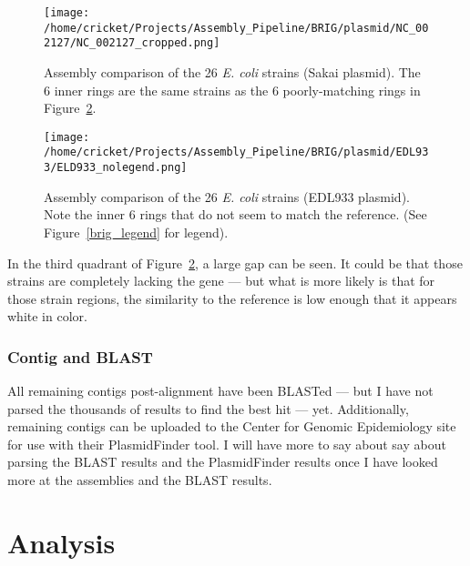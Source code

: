 \documentclass[11pt]{article}
\begin{document}
\begin{figure}[h!]\normalsize %
\centering
\texttt{[image: /home/cricket/Projects/Assembly\_Pipeline/BRIG/plasmid/NC\_002127/NC\_002127\_cropped.png]}
\caption{Assembly comparison of the 26 \textit{E. coli} strains (Sakai plasmid). The 6 inner rings are the same strains as the 6 poorly-matching rings in Figure~\ref{plasmid_alignment_1}.}
\label{plasmid_alignment_2}
\end{figure}

\begin{figure}[h!]\normalsize %
\centering
\texttt{[image: /home/cricket/Projects/Assembly\_Pipeline/BRIG/plasmid/EDL933/ELD933\_nolegend.png]}
\caption{Assembly comparison of the 26 \textit{E. coli} strains (EDL933 plasmid). Note the inner 6 rings that do not seem to match the reference. (See Figure~\ref{brig_legend} for legend).}
\label{plasmid_alignment_1}
\end{figure}
\clearpage


In the third quadrant of Figure~\ref{plasmid_alignment_1}, a large gap can be seen. It could be that those strains are completely lacking the gene --- but what is more likely is that for those strain regions, the similarity to the reference is low enough that it appears white in color. 

\subsubsection*{Contig and BLAST}
All remaining contigs post-alignment have been BLASTed --- but I have not parsed the thousands of results to find the best hit --- yet. Additionally, remaining contigs can be uploaded to the Center for Genomic Epidemiology site for use with their PlasmidFinder tool. I will have more to say about say about parsing the BLAST results and the PlasmidFinder results once I have looked more at the assemblies and the BLAST results. \\

\section*{Analysis}
\end{document}

